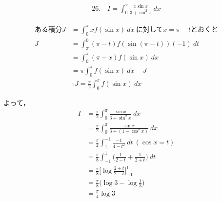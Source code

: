 \documentclass[autodetect-engine,ja=standard, 10.5pt, a4paper, titlepage]{bxjsarticle}
\numberwithin{equation}{section} %
\begin{document}
  \begin{fleqn}[0pt]
    \begin{align*}
      26.\quad I = \int_{0}^{\pi} \frac{x\sin x}{3 + \sin^2 x} \:dx
    \end{align*}
  \end{fleqn}
  \begin{fleqn}[25pt]
    \begin{align*}
      \text{ある積分} J &= \int_{0}^{\pi}xf(\sin x)\:dx \:\text{に対して$x=\pi-t$とおくと} \\
      J 
      &= \int_{\pi}^{0}(\pi - t)f(\sin(\pi-t))(-1)\:dt \\
      &= \int_{0}^{\pi}(\pi - x)f(\sin x)\:dx \\
      &= \pi \int_{0}^{\pi}f(\sin x)\:dx - J \\
      &\therefore J = \frac{\pi}{2}\int_{0}^{\pi}f(\sin x)\:dx
    \end{align*}
  \end{fleqn}
  \begin{fleqn}[25pt]
    \hspace*{25pt}よって，
    \begin{align*}
      I 
      &= \frac{\pi}{2}\int_{0}^{\pi}\frac{\sin x}{3 + \sin^2x}\:dx \\
      &= \frac{\pi}{2}\int_{0}^{\pi}\frac{\sin x}{3 + (1-\cos^2x)}\:dx \\
      &= \frac{\pi}{2}\int_{1}^{-1}\frac{-1}{4-t^2}\:dt\:(\cos x = t) \\
      &= \frac{\pi}{8}\int_{-1}^{1}\biggl( \frac{1}{2-t} + \frac{1}{2+t} \biggr) \:dt \\
      &= \frac{\pi}{8}\biggl[ \log\frac{2+t}{2-t} \biggr]_{-1}^{1} \\
      &= \frac{\pi}{8}\biggl( \log3 - \log\frac{1}{3} \biggr) \\
      &= \frac{\pi}{4}\log3
    \end{align*}
  \end{fleqn}
 
\end{document}
